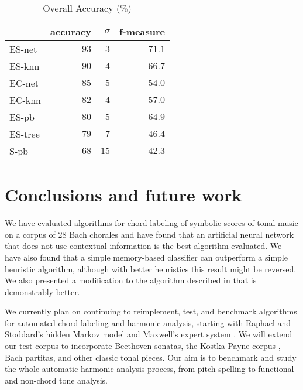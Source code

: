 \begin{table}
  \centering
  \begin{tabular}{l|rrr}
       & accuracy& $\sigma$  & f-measure\\
\hline
ES-net &$   93  $&$  3$      &$71.1$ \\
ES-knn &$   90  $&$  4$      &$66.7$ \\
EC-net &$   85  $&$  5$      &$54.0$ \\
EC-knn &$   82  $&$  4$      &$57.0$ \\
ES-pb  &$   80  $&$  5$      &$64.9$ \\
ES-tree&$   79  $&$  7$      &$46.4$ \\
S-pb   &$   68  $&$ 15$      &$42.3$ \\

  \end{tabular}                                                        


  \caption{Overall Accuracy (\%)}
  \label{tab:accuracy}
\end{table}

\section{Conclusions and future work}
\label{sec:conclusions}

We have evaluated algorithms for chord labeling of symbolic scores of
tonal music on a corpus of 28 Bach chorales and have found that an
artificial neural network that does not use contextual information is
the best algorithm evaluated. We have also found that a simple
memory-based classifier can outperform a simple heuristic algorithm,
although with better heuristics this result might be reversed. We also
presented a modification to the algorithm described in
\cite{pardo.ea02:algorithms} that is demonstrably better.

We currently plan on continuing to reimplement, test, and benchmark
algorithms for automated chord labeling and harmonic analysis,
starting with Raphael and Stoddard's hidden Markov model
\cite{raphael.ea03:harmonic} and Maxwell's expert system
\cite{maxwell92:expert}.  We will extend our test corpus to
incorporate Beethoven sonatas, the Kostka-Payne corpus
\cite{temperley04:bayesian}, Bach partitas, and other classic tonal
pieces. Our aim is to benchmark and study the whole automatic harmonic
analysis process, from pitch spelling to functional and non-chord tone
analysis.

